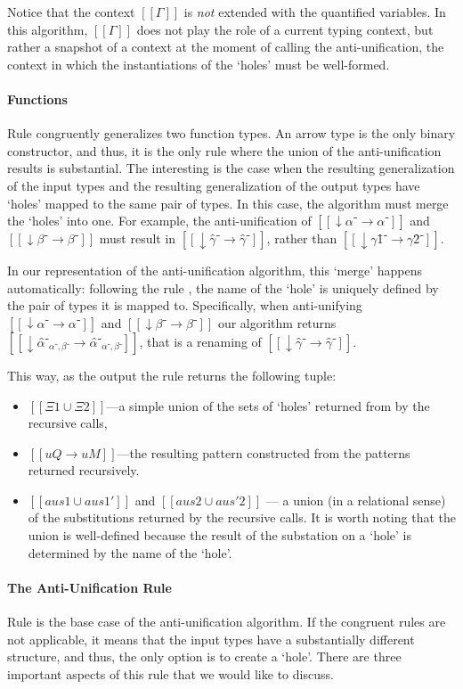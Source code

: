   Notice that the context $[[Γ]]$ is \emph{not} extended with 
  the quantified variables. In this algorithm, $[[Γ]]$ 
  does not play the role of a current typing context, but rather
  a snapshot of a context at the moment of calling the anti-unification,
  \ie the context in which the instantiations of the `holes' 
  must be well-formed.

\paragraph{Functions}
  Rule  congruently generalizes two function types. 
  An arrow type is the only binary constructor, 
  and thus, it is the only rule where the union of the anti-unification results is substantial.
  The interesting is the case when the resulting generalization of the 
  input types and the resulting generalization of the output types 
  have `holes' mapped to the same pair of types. 
  In this case, the algorithm must merge the `holes' into one.
  For example, the anti-unification of 
  $[[↓α⁻ → α⁻]]$ and $[[↓β⁻ → β⁻]]$
  must result in $[[↓γ̂⁻ → γ̂⁻]]$,
  rather than $[[↓γ1̂⁻ → γ2̂⁻]]$.

  In our representation of the anti-unification algorithm, this `merge' happens
  automatically:
  following the rule ,
  the name of the `hole' is uniquely defined by the pair of types it is mapped to.  
  Specifically, when anti-unifying $[[↓α⁻ → α⁻]]$ and $[[↓β⁻ → β⁻]]$ our algorithm returns 
  $[[↓α̂⁻_{α⁻, β⁻} → α̂⁻_{α⁻, β⁻}]]$, that is a renaming of $[[↓γ̂⁻ → γ̂⁻]]$.

  This way, as the output the rule returns the following tuple:
  \begin{itemize}
    \item $[[Ξ1 ∪ Ξ2]]$---a simple union of the sets of `holes' 
      returned from by the recursive calls, 
    \item $[[uQ → uM]]$---the resulting pattern 
      constructed from the patterns returned recursively.
    \item $[[aus1 ∪ aus1']]$ and $[[aus2 ∪ aus'2]]$
      --- a union (in a relational sense)
      of the substitutions returned by the recursive calls. 
      It is worth noting that the union is well-defined because
      the result of the substation on a `hole' is determined by the 
      name of the `hole'.
  \end{itemize}

\paragraph{The Anti-Unification Rule}
  Rule  is the base case of the anti-unification
  algorithm. If the congruent rules are not applicable, 
  it means that the input types have a substantially different structure,
  and thus, the only option is to create a `hole'. 
  There are three important aspects of this rule that we would like to discuss.

